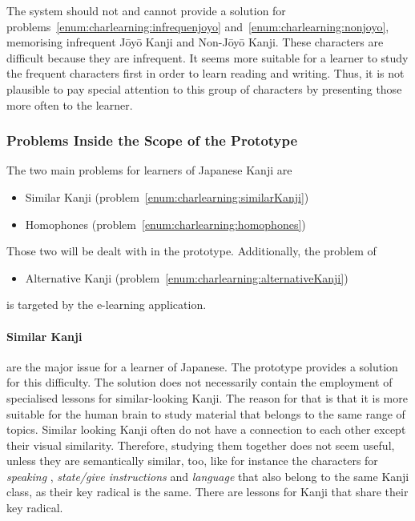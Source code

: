The system should not and cannot provide a solution for 
problems~\ref{enum:charlearning:infrequenjoyo} 
and~\ref{enum:charlearning:nonjoyo}, memorising infrequent Jōyō 
Kanji and Non-Jōyō Kanji. These characters are difficult because they are 
infrequent. It seems more suitable for a learner to study the frequent characters
first in order to learn reading and writing. Thus, it is not plausible to pay 
special attention to this group of characters by presenting those more often to 
the learner.

\subsubsection{Problems Inside the Scope of the Prototype}
\label{sec:concept:problemsinscope}

The two main problems for learners of Japanese Kanji are 
\begin{itemize}
  \item Similar Kanji (problem~\ref{enum:charlearning:similarKanji})
  \item Homophones (problem~\ref{enum:charlearning:homophones})
\end{itemize}
Those two will be dealt with in the prototype. Additionally, the problem of
\begin{itemize}
  \item Alternative Kanji (problem~\ref{enum:charlearning:alternativeKanji})
\end{itemize}
is targeted by the e-learning application.

\paragraph{Similar Kanji} are the major issue for a learner of Japanese. The 
prototype provides a solution for this difficulty.
The solution does not necessarily contain the employment of specialised lessons 
for similar-looking Kanji. The reason for that is that it is more suitable for 
the human brain to study material that belongs to the same range of topics. 
Similar looking Kanji often do not have a connection to each other except their 
visual similarity. Therefore, studying them together does not seem useful,
unless they are semantically similar, too, like for instance the characters for
\emph{speaking} , \emph{state/give instructions}  and 
\emph{language}  that also belong to the same Kanji class, 
as their key radical is the same. There are lessons for Kanji that share
their key radical.

